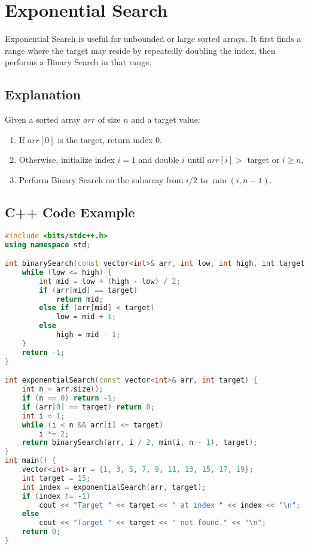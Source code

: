 \section{Exponential Search}
Exponential Search is useful for unbounded or large sorted arrays. It first finds a range where the target may reside by repeatedly doubling the index, then performs a Binary Search in that range.

\subsection{Explanation}
Given a sorted array \( arr \) of size \( n \) and a target value:
\begin{enumerate}
  \item If \( arr[0] \) is the target, return index 0.
  \item Otherwise, initialize index \( i = 1 \) and double \( i \) until \( arr[i] > \) target or \( i \geq n \).
  \item Perform Binary Search on the subarray from \( i/2 \) to \( \min(i, n-1) \).
\end{enumerate}

\subsection{C++ Code Example}
\begin{lstlisting}[language=C++, caption={Exponential Search Implementation}]
#include <bits/stdc++.h>
using namespace std;

int binarySearch(const vector<int>& arr, int low, int high, int target) {
    while (low <= high) {
        int mid = low + (high - low) / 2;
        if (arr[mid] == target)
            return mid;
        else if (arr[mid] < target)
            low = mid + 1;
        else
            high = mid - 1;
    }
    return -1;
}

int exponentialSearch(const vector<int>& arr, int target) {
    int n = arr.size();
    if (n == 0) return -1;
    if (arr[0] == target) return 0;
    int i = 1;
    while (i < n && arr[i] <= target)
        i *= 2;
    return binarySearch(arr, i / 2, min(i, n - 1), target);
}
int main() {
    vector<int> arr = {1, 3, 5, 7, 9, 11, 13, 15, 17, 19};
    int target = 15;
    int index = exponentialSearch(arr, target);
    if (index != -1)
        cout << "Target " << target << " at index " << index << "\n";
    else
        cout << "Target " << target << " not found." << "\n"; 
    return 0;
}
\end{lstlisting}

